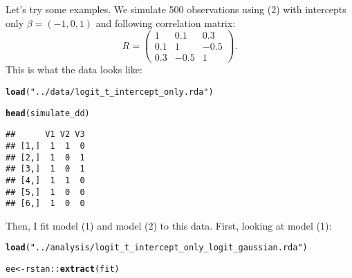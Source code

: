 \documentclass{article}\usepackage[]{graphicx}\usepackage[]{color}
\makeatletter
\newcommand{\hlstr}[1]{\textcolor[rgb]{0.192,0.494,0.8}{#1}}%
\newcommand{\hlopt}[1]{\textcolor[rgb]{0,0,0}{#1}}%
\newcommand{\hlstd}[1]{\textcolor[rgb]{0.345,0.345,0.345}{#1}}%
\newcommand{\hlkwb}[1]{\textcolor[rgb]{0.69,0.353,0.396}{#1}}%
\newcommand{\hlkwd}[1]{\textcolor[rgb]{0.737,0.353,0.396}{\textbf{#1}}}%
\newenvironment{kframe}{%
 \def\at@end@of@kframe{}%
 \ifinner\ifhmode%
  \def\at@end@of@kframe{\end{minipage}}%
  \begin{minipage}{\columnwidth}%
 \fi\fi%
 \def\FrameCommand##1{\hskip\@totalleftmargin \hskip-\fboxsep
 \colorbox{shadecolor}{##1}\hskip-\fboxsep
     \hskip-\linewidth \hskip-\@totalleftmargin \hskip\columnwidth}%
 \MakeFramed {\advance\hsize-\width
   \@totalleftmargin\z@ \linewidth\hsize
   \@setminipage}}%
 {\par\unskip\endMakeFramed%
 \at@end@of@kframe}
\newenvironment{knitrout}{}{} %
\makeatother
\begin{document}
Let's try some examples. We simulate 500 observations using (2) with intercepts only $\beta = (-1, 0, 1)$ and following correlation matrix:
$$
R = \begin{pmatrix}
1 & 0.1 & 0.3\\
0.1 & 1 & -0.5\\
0.3 & -0.5 & 1
\end{pmatrix}.
$$
This is what the data looks like:
\begin{knitrout}
\color{fgcolor}\begin{kframe}
\begin{alltt}
\hlkwd{load}\hlstd{(}\hlstr{"../data/logit_t_intercept_only.rda"}\hlstd{)}

\hlkwd{head}\hlstd{(simulate_dd)}
\end{alltt}
\begin{verbatim}
##      V1 V2 V3
## [1,]  1  1  0
## [2,]  1  0  1
## [3,]  1  0  1
## [4,]  1  1  0
## [5,]  1  0  0
## [6,]  1  0  0
\end{verbatim}
\end{kframe}
\end{knitrout}

Then, I fit model (1) and model (2) to this data. First, looking at model (1):
\begin{knitrout}
\color{fgcolor}\begin{kframe}
\begin{alltt}
\hlkwd{load}\hlstd{(}\hlstr{"../analysis/logit_t_intercept_only_logit_gaussian.rda"}\hlstd{)}

\hlstd{ee} \hlkwb{<-} \hlstd{rstan}\hlopt{::}\hlkwd{extract}\hlstd{(fit)}
\end{alltt}
\end{kframe}
\end{knitrout}
\end{document}
